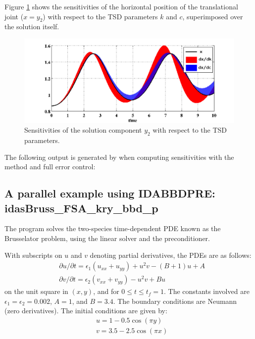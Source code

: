 Figure \ref{f:x2sensi} shows the sensitivities of the horizontal position of the
translational joint ($x = y_2$) with respect to the TSD parameters $k$ and $c$,
superimposed over the solution itself.
\begin{figure}[h]
  {\centerline{\includegraphics[width=\textwidth]{figs_slcrank/x2sensi}}}
  \caption{Sensitivities of the solution component $y_2$ with respect to the TSD parameters.}
  \label{f:x2sensi}
\end{figure}

The following output is generated by  when computing
sensitivities with the  method and full error control:




\subsection{A parallel example using IDABBDPRE: idasBruss\_FSA\_kry\_bbd\_p}
\label{ss:idasBruss_FSA_kry_bbd_p}

The  program solves the two-species time-dependent
PDE known as the Brusselator problem, using the {\idaspgmr} linear solver and the
{\idabbdpre} preconditioner.

With subscripts on $u$ and $v$ denoting partial derivatives, the PDEs
are as follows:
\begin{equation*}
\begin{split}
  &\partial u / \partial t = \epsilon_1 (u_{xx} + u_{yy})
                              + u^2 v - (B + 1) u + A \\
  &\partial v / \partial t = \epsilon_2 (v_{xx} + v_{yy})
                              - u^2 v + B  u
\end{split}
\end{equation*}
on the unit square in $(x,y)$, and for $0 \leq t \leq t_f = 1$.
The constants involved are $\epsilon_1 = \epsilon_2 = 0.002$, $A = 1$,
and $B = 3.4$.  The boundary conditions are Neumann (zero derivatives).
The initial conditions are given by:
\begin{equation*}
\begin{split}
  &u = 1 - 0.5 \cos(\pi y) \\
  &v = 3.5 - 2.5 \cos(\pi x)
\end{split}
\end{equation*}

